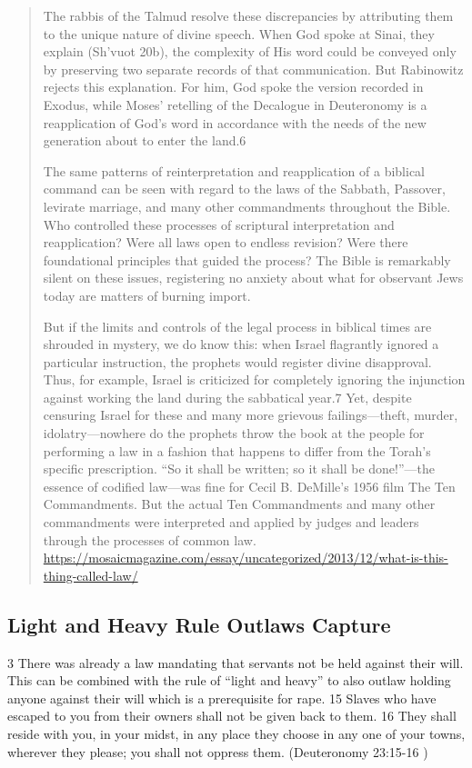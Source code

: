 \documentclass[11pt]{article}
\begin{document}
\begin{quote}
The rabbis of the Talmud resolve these discrepancies by attributing them to the unique nature of divine speech. When God spoke at Sinai, they explain (Sh’vuot 20b), the complexity of His word could be conveyed only by preserving two separate records of that communication. But Rabinowitz rejects this explanation. For him, God spoke the version recorded in Exodus, while Moses’ retelling of the Decalogue in Deuteronomy is a reapplication of God’s word in accordance with the needs of the new generation about to enter the land.6

The same patterns of reinterpretation and reapplication of a biblical command can be seen with regard to the laws of the Sabbath, Passover, levirate marriage, and many other commandments throughout the Bible. Who controlled these processes of scriptural interpretation and reapplication? Were all laws open to endless revision? Were there foundational principles that guided the process? The Bible is remarkably silent on these issues, registering no anxiety about what for observant Jews today are matters of burning import.

But if the limits and controls of the legal process in biblical times are shrouded in mystery, we do know this: when Israel flagrantly ignored a particular instruction, the prophets would register divine disapproval. Thus, for example, Israel is criticized for completely ignoring the injunction against working the land during the sabbatical year.7 Yet, despite censuring Israel for these and many more grievous failings—theft, murder, idolatry—nowhere do the prophets throw the book at the people for performing a law in a fashion that happens to differ from the Torah’s specific prescription. “So it shall be written; so it shall be done!”—the essence of codified law—was fine for Cecil B. DeMille’s 1956 film The Ten Commandments. But the actual Ten Commandments and many other commandments were interpreted and applied by judges and leaders through the processes of common law.
\url{https://mosaicmagazine.com/essay/uncategorized/2013/12/what-is-this-thing-called-law/}
\end{quote}


\subsection{Light and Heavy Rule Outlaws Capture}
3 There was already a law mandating that servants not be held against their will. This can be combined with the rule of “light and heavy” to also outlaw holding anyone against their will which is a prerequisite for rape.
15 Slaves who have escaped to you from their owners shall not be given back to them. 16 They shall reside with you, in your midst, in any place they choose in any one of your towns, wherever they please; you shall not oppress them. (Deuteronomy 23:15-16 )
\end{document}
